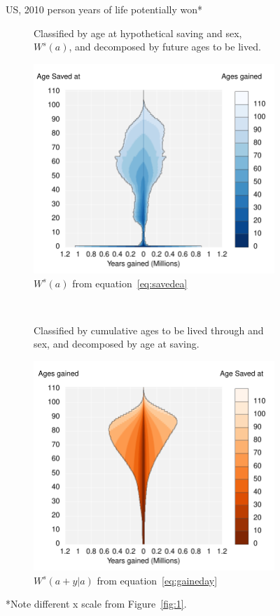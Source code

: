 \documentclass{article}
\begin{document}
\begin{figure}
\centering
\caption{US, 2010 person years of life potentially won*}
\label{fig:2}
\begin{subfigure}[b]{.48\linewidth}
\centering
	\caption{Classified by age at hypothetical saving and sex, $W^s(a)$, and
	decomposed by future ages to be lived.}
	\label{fig:SavedGained}
	\includegraphics[scale=.55]{Figures/YearsSavedGainedxx10.pdf}
	\caption*{$W^s(a)$ from equation~\ref{eq:savedea}}	
\end{subfigure}
~
\begin{subfigure}[b]{.48\linewidth}
\centering
    \caption{Classified by cumulative ages to be lived through and sex, and
    decomposed by age at saving.}
	\label{fig:LostLived}
    \includegraphics[scale=.55]{Figures/YearsLostLivedyx10.pdf}
    \caption*{$W^s(a+y|a)$ from equation~\ref{eq:gaineday}}	
\end{subfigure}
\caption*{*Note different x scale from Figure~\ref{fig:1}.}
\end{figure}
\end{document}

